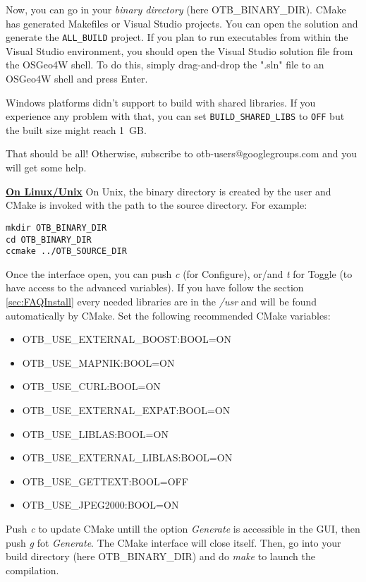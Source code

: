 Now, you can go in your \emph{binary directory} (here OTB\_BINARY\_DIR). CMake has generated Makefiles or
Visual Studio projects. You can open the solution and generate the \texttt{ALL\_BUILD} project.
If you plan to run executables from within the Visual Studio environment, you should open the Visual Studio 
solution file from the OSGeo4W shell. To do this, simply drag-and-drop the ".sln" file to an OSGeo4W shell 
and press Enter.

Windows platforms didn't support to build with shared libraries. If you experience any problem
with that, you can set \texttt{BUILD\_SHARED\_LIBS} to \texttt{OFF} but the
built size might reach 1~GB. 

That should be all! Otherwise, subscribe to
otb-users@googlegroups.com and you will get some help.

\textbf{\underline{On Linux/Unix}}
On Unix, the binary directory is created by the user and CMake is invoked with the
path to the source directory. For example:
\small
\begin{verbatim}
mkdir OTB_BINARY_DIR
cd OTB_BINARY_DIR
ccmake ../OTB_SOURCE_DIR
\end{verbatim}
\normalsize

Once the interface open, you can push \emph{c} (for Configure), or/and \emph{t} for Toggle (to have access to the advanced variables). If you have follow the section \ref{sec:FAQInstall} every needed libraries are in the
\emph{/usr} and will be found automatically by CMake. Set the following recommended CMake variables:
\begin{itemize}
\item OTB\_USE\_EXTERNAL\_BOOST:BOOL=ON
\item OTB\_USE\_MAPNIK:BOOL=ON
\item OTB\_USE\_CURL:BOOL=ON
\item OTB\_USE\_EXTERNAL\_EXPAT:BOOL=ON
\item OTB\_USE\_LIBLAS:BOOL=ON
\item OTB\_USE\_EXTERNAL\_LIBLAS:BOOL=ON
\item OTB\_USE\_GETTEXT:BOOL=OFF
\item OTB\_USE\_JPEG2000:BOOL=ON
\end{itemize}

Push \emph{c} to update CMake untill the option \emph{Generate} is accessible in the GUI,
then push \emph{g} fot \emph{Generate}. The CMake interface will close itself.
Then, go into your build directory (here OTB\_BINARY\_DIR) and do \emph{make} to launch the compilation.

